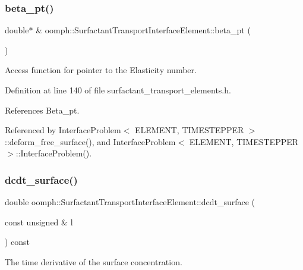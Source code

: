 \subsubsection{\texorpdfstring{beta\+\_\+pt()}{beta\_pt()}}
{\footnotesize\ttfamily double$\ast$ \& oomph\+::\+Surfactant\+Transport\+Interface\+Element\+::beta\+\_\+pt (\begin{DoxyParamCaption}{ }\end{DoxyParamCaption})\hspace{0.3cm}{\ttfamily [inline]}}



Access function for pointer to the Elasticity number. 



Definition at line 140 of file surfactant\+\_\+transport\+\_\+elements.\+h.



References Beta\+\_\+pt.



Referenced by Interface\+Problem$<$ E\+L\+E\+M\+E\+N\+T, T\+I\+M\+E\+S\+T\+E\+P\+P\+E\+R $>$\+::deform\+\_\+free\+\_\+surface(), and Interface\+Problem$<$ E\+L\+E\+M\+E\+N\+T, T\+I\+M\+E\+S\+T\+E\+P\+P\+E\+R $>$\+::\+Interface\+Problem().

\mbox{\label{classoomph_1_1SurfactantTransportInterfaceElement_a7b5cc851b94d836a3caa2130cbf45bec}} 
\subsubsection{\texorpdfstring{dcdt\+\_\+surface()}{dcdt\_surface()}}
{\footnotesize\ttfamily double oomph\+::\+Surfactant\+Transport\+Interface\+Element\+::dcdt\+\_\+surface (\begin{DoxyParamCaption}\item[{const unsigned \&}]{l }\end{DoxyParamCaption}) const\hspace{0.3cm}{\ttfamily [protected]}}



The time derivative of the surface concentration. 



